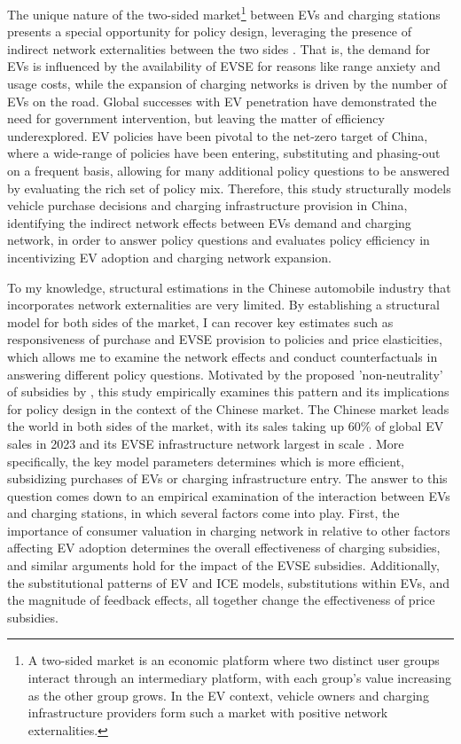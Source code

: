 \documentclass[12pt]{article}
\begin{document}
The unique nature of the two-sided market\footnote{A two-sided market is an economic platform where two distinct user groups interact through an intermediary platform, with each group's value increasing as the other group grows. In the EV context, vehicle owners and charging infrastructure providers form such a market with positive network externalities.} between EVs and charging stations presents a special opportunity for policy design, 
leveraging the presence of indirect network externalities between the two sides \citep{kellogg_energy_2021}. 
That is, the demand for EVs is influenced by the availability of EVSE for reasons like range anxiety and usage costs, while the expansion of charging networks is driven by the number of EVs on the road.
Global successes with EV penetration have demonstrated the need for government intervention, but leaving the matter of efficiency underexplored. 
EV policies have been pivotal to the net-zero target of China, where a wide-range of policies have been entering, substituting and phasing-out on a frequent basis, 
allowing for many additional policy questions to be answered by evaluating the rich set of policy mix.
Therefore, this study structurally models vehicle purchase decisions and charging infrastructure provision in China, identifying the indirect network effects between EVs demand and charging network,
in order to answer policy questions and evaluates policy efficiency in incentivizing EV adoption and charging network expansion.

To my knowledge, structural estimations in the Chinese automobile industry that incorporates network externalities are very limited. 
By establishing a structural model for both sides of the market, I can recover key estimates such as responsiveness of purchase and EVSE provision to policies and price elasticities,
which allows me to examine the network effects and conduct counterfactuals in answering different policy questions.  
Motivated by the proposed 'non-neutrality' of subsidies by \citet{springel_network_2021}, this study empirically examines this pattern and its implications for policy design in the context of the Chinese market.
The Chinese market leads the world in both sides of the market, with its sales taking up 60\% of global EV sales in 2023 and its EVSE infrastructure network largest in scale \citep{international_energy_agency_global_2025}.
More specifically, the key model parameters determines which is more efficient, subsidizing purchases of EVs or charging infrastructure entry.
The answer to this question comes down to an empirical examination of the interaction between EVs and charging stations, in which several factors come into play.
First, the importance of consumer valuation in charging network in relative to other factors affecting EV adoption determines the overall effectiveness of charging subsidies, 
and similar arguments hold for the impact of the EVSE subsidies. Additionally, the substitutional patterns of EV and ICE models, substitutions within EVs, 
and the magnitude of feedback effects, all together change the effectiveness of price subsidies. 
\end{document}
